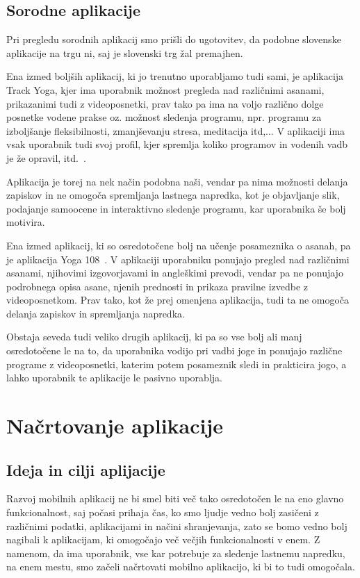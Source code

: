 \documentclass[a4paper, 12pt]{book}
\begin{document}
\section{Sorodne aplikacije}
Pri pregledu sorodnih aplikacij smo prišli do ugotovitev, da podobne slovenske aplikacije na trgu ni, saj je slovenski trg žal premajhen.

Ena izmed boljših aplikacij, ki jo trenutno uporabljamo tudi sami, je aplikacija Track Yoga, kjer ima uporabnik možnost pregleda nad različnimi asanami, prikazanimi tudi z videoposnetki, prav tako pa ima na voljo različno dolge posnetke vodene prakse oz. možnost sledenja programu, npr. programu za izboljšanje fleksibilnosti, zmanjševanju stresa, meditacija itd,... V aplikaciji ima vsak uporabnik tudi svoj profil, kjer spremlja koliko programov in vodenih vadb je že opravil, itd.~\cite{trackyoga}.

Aplikacija je torej na nek način podobna naši, vendar pa nima možnosti delanja zapiskov in ne omogoča spremljanja lastnega napredka, kot je objavljanje slik, podajanje samoocene in interaktivno sledenje programu, kar uporabnika še bolj motivira.

Ena izmed aplikacij, ki so osredotočene bolj na učenje posameznika o asanah, pa je aplikacija Yoga 108~\cite{yoga108}. V aplikaciji uporabniku ponujajo pregled nad različnimi asanami, njihovimi izgovorjavami in angleškimi prevodi, vendar pa ne ponujajo podrobnega opisa asane, njenih prednosti in prikaza pravilne izvedbe z videoposnetkom. 
Prav tako, kot že prej omenjena aplikacija, tudi ta ne omogoča delanja zapiskov in spremljanja napredka.

Obstaja seveda tudi veliko drugih aplikacij, ki pa so vse bolj ali manj osredotočene le na to, da uporabnika vodijo pri vadbi joge in ponujajo različne programe z videoposnetki, katerim potem posameznik sledi in prakticira jogo, a lahko uporabnik te aplikacije le pasivno uporablja.


\chapter{Načrtovanje aplikacije}
\label{ch1}

\section{Ideja in cilji aplijacije}
Razvoj mobilnih aplikacij ne bi smel biti več tako osredotočen le na eno glavno funkcionalnost, saj počasi prihaja čas, ko smo ljudje vedno bolj zasičeni z različnimi podatki, aplikacijami in načini shranjevanja, zato se bomo vedno bolj nagibali k aplikacijam, ki omogočajo več večjih funkcionalnosti v enem. Z namenom, da ima uporabnik, vse kar potrebuje za sledenje lastnemu napredku, na enem mestu, smo začeli načrtovati mobilno aplikacijo, ki bi to tudi omogočala.
\end{document}
